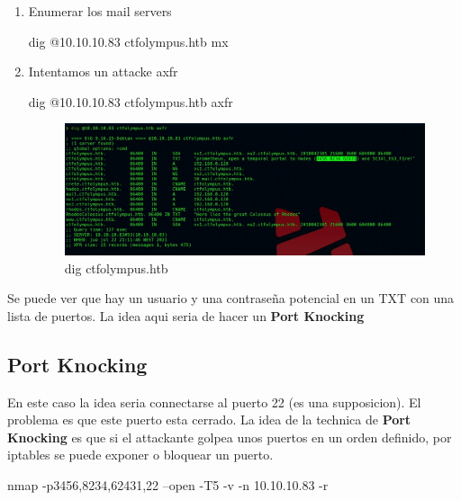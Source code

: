\documentclass{assets/ipesethesis}
\newenvironment{Shaded}{\begin{snugshade}}{\end{snugshade}}
\newcommand{\ExtensionTok}[1]{#1}
\newcommand{\FunctionTok}[1]{\textcolor[rgb]{0.00,0.00,0.00}{#1}}
\newcommand{\NormalTok}[1]{#1}
\begin{document}
\begin{enumerate}
\def\labelenumi{\arabic{enumi}.}
\item
  Enumerar los mail servers

\begin{Shaded}
\begin{Highlighting}[]
\ExtensionTok{dig}\NormalTok{ @10.10.10.83 ctfolympus.htb mx}
\end{Highlighting}
\end{Shaded}
\item
  Intentamos un attacke axfr

\begin{Shaded}
\begin{Highlighting}[]
\ExtensionTok{dig}\NormalTok{ @10.10.10.83 ctfolympus.htb axfr}
\end{Highlighting}
\end{Shaded}

  \begin{figure}
   \includegraphics[width=0.9\linewidth]{images/dig-ctfolympus} \caption{dig ctfolympus.htb}\label{fig:unnamed-chunk-4}
   \end{figure}
\end{enumerate}

Se puede ver que hay un usuario y una contraseña potencial en un TXT con una lista de puertos.
La idea aqui seria de hacer un \textbf{Port Knocking}

\hypertarget{port-knocking}{%
\subsection*{Port Knocking}\label{port-knocking}}

En este caso la idea seria connectarse al puerto 22 (es una supposicion). El problema es que este puerto esta cerrado.
La idea de la technica de \textbf{Port Knocking} es que si el attackante golpea unos puertos en un orden definido, por
iptables se puede exponer o bloquear un puerto.

\begin{Shaded}
\begin{Highlighting}[]
\FunctionTok{nmap}\NormalTok{ -p3456,8234,62431,22 --open -T5 -v -n 10.10.10.83 -r}
\end{Highlighting}
\end{Shaded}
\end{document}
